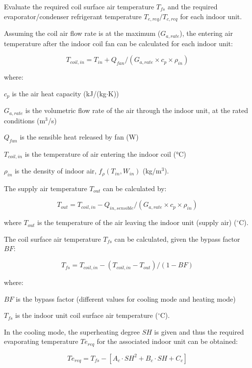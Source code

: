 Evaluate the required coil surface air temperature $T_{fs}$ and the required evaporator/condenser refrigerant temperature $T_{e,req}/{T_{c,req}}$ for each indoor unit.

Assuming the coil air flow rate is at the maximum ($G_{a,rate}$), the entering air temperature after the indoor coil fan can be calculated for each indoor unit:

\begin{equation}
  T_{coil,in}=T_{in}+Q_{fan}/(G_{a,rate}\times{c_p}\times\rho_{in})
\end{equation}

where:

$c_p$ is the air heat capacity (kJ/(kg$\cdot$K))

$G_{a,rate}$	 is the volumetric flow rate of the air through the indoor unit, at the rated conditions (m\(^3\)/s)

$Q_{fan}$ is the sensible heat released by fan (W)

$T_{coil,in}$ is the temperature of air entering the indoor coil (°C)

$\rho_{in}$ is the density of indoor air, $f_{\rho}(T_{in},W_{in})$ (kg/m\(^3\)).

The supply air temperature $T_{out}$ can be calculated by:

\begin{equation}
  T_{out} = T_{coil,in} - Q_{in, sensible} / (G_{a,rate}\times{c_p}\times\rho_{in})
\end{equation}

where $T_{out}$ is the temperature of the air leaving the indoor unit (supply air) (\(^{\circ}\)C).

The coil surface air temperature $T_{fs}$ can be calculated, given the bypass factor $BF$:

\begin{equation}
  T_{fs}= T_{coil,in} - (T_{coil,in}-T_{out}) / (1-BF)
\end{equation}

where:

$BF$ is the bypass factor (different values for cooling mode and heating mode)

$T_{fs}$ is the indoor unit coil surface air temperature (\(^{\circ}\)C).

In the cooling mode, the superheating degree $SH$ is given and thus the required evaporating temperature $Te_{req}$ for the associated indoor unit can be obtained:

\begin{equation}
  Te_{req}=T_{fs}-[A_c\cdot SH^2+B_c\cdot SH+C_c]
\end{equation}


